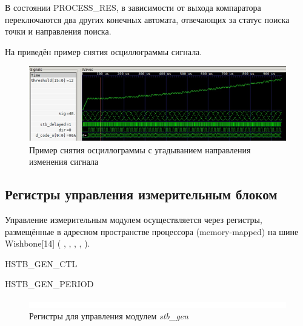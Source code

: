 В состоянии PROCESS\_RES, в зависимости от выхода компаратора переключаются два других конечных автомата, отвечающих за статус поиска точки и направления поиска.

На  приведён пример снятия осциллограммы сигнала.

\begin{figure}[ht!] 
	\center
	\includegraphics  {my_folder/images//p_find}
	\caption{Пример снятия осциллограммы с угадыванием направления изменения сигнала} 
	\label{fig:p-find}  
\end{figure}

\subsection{Регистры управления измерительным блоком}

Управление измерительным модулем осуществляется через регистры, размещённые в адресном пространстве процессора (memory-mapped) на шине Wishbone[14] ( , ,
, , ).

\begin{register}{H}{STB\_GEN\_CTL}{}%
\label{example}%
%
%
%
%
 \regnewline%

%
%
%
%
\regnewline%
\end{register}

\begin{register}{H}{STB\_GEN\_PERIOD}{}%
\label{example}%
%
 \regnewline%
\end{register}

\begin{figure}[ht!] 
	\center
	\includegraphics  {my_folder/images//blank}
	\caption{Регистры для управления модулем \emph{stb\_gen}} 
	\label{fig:stb-reg}  
\end{figure}

